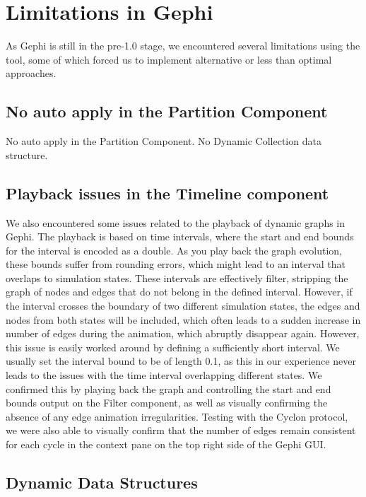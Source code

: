 \section{Limitations in Gephi}

As Gephi is still in the pre-1.0 stage, we encountered several
limitations using the tool, some of which forced us to implement
alternative or less than optimal approaches.

\subsection{No auto apply in the Partition Component}
No auto apply in the Partition Component. No Dynamic Collection data
structure.

\subsection{Playback issues in the Timeline component}

We also encountered some issues related to the playback of dynamic
graphs in Gephi. The playback is based on time intervals, where the
start and end bounds for the interval is encoded as a double. As you
play back the graph evolution, these bounds suffer from rounding errors,
which might lead to an interval that overlaps to simulation states.
These intervals are effectively filter, stripping the graph of nodes and
edges that do not belong in the defined interval. However, if the
interval crosses the boundary of two different simulation states, the
edges and nodes from both states will be included, which often leads to
a sudden increase in number of edges during the animation, which
abruptly disappear again. However, this issue is easily worked around by
defining a sufficiently short interval. We usually set the interval
bound to be of length 0.1, as this in our experience never leads to the
issues with the time interval overlapping different states. We confirmed
this by playing back the graph and controlling the start and end bounds
output on the Filter component, as well as visually confirming the
absence of any edge animation irregularities. Testing with the Cyclon
protocol, we were also able to visually confirm that the number of edges
remain consistent for each cycle in the context pane on the top right
side of the Gephi GUI\@.

\subsection{Dynamic Data Structures}

